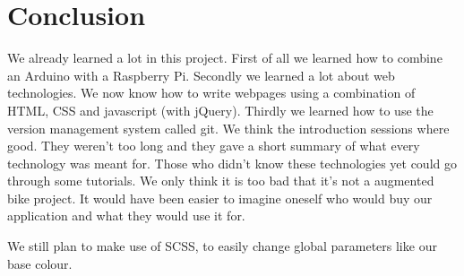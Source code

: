 \section{Conclusion}
We already learned a lot in this project. First of all we learned how to combine an
Arduino with a Raspberry Pi. Secondly we learned a lot about web technologies. We now
know how to write webpages using a combination of HTML, CSS and javascript (with
jQuery). Thirdly we learned how to use the version management system called git.
We think the introduction sessions where good. They weren't too long and they gave
a short summary of what every technology was meant for. Those who didn't know these
technologies yet could go through some tutorials. We only think it is too bad that it's
not a augmented bike project. It would have been easier to imagine oneself who would buy
our application and what they would use it for.

We still plan to make use of SCSS, to easily change global parameters like our base colour.
